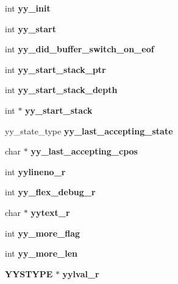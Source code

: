 \begin{DoxyCompactItemize}
\item 
int {\bfseries yy\-\_\-init}\label{structyyguts__t_abbef56b2d8359f6a15629c104f5dd030}

\item 
int {\bfseries yy\-\_\-start}\label{structyyguts__t_a8baf7d47fe53035d9bc2a9670795ff01}

\item 
int {\bfseries yy\-\_\-did\-\_\-buffer\-\_\-switch\-\_\-on\-\_\-eof}\label{structyyguts__t_a2daec411627700709ef2fd927e69627d}

\item 
int {\bfseries yy\-\_\-start\-\_\-stack\-\_\-ptr}\label{structyyguts__t_ad9e132dacc2904a8ae76c64c72e33795}

\item 
int {\bfseries yy\-\_\-start\-\_\-stack\-\_\-depth}\label{structyyguts__t_a35bedf1c17debd766565b99c39132eb4}

\item 
int $\ast$ {\bfseries yy\-\_\-start\-\_\-stack}\label{structyyguts__t_af6e2e45a5fdba0f313c680b35da4292a}

\item 
yy\-\_\-state\-\_\-type {\bfseries yy\-\_\-last\-\_\-accepting\-\_\-state}\label{structyyguts__t_a84e01a3658729e9d69f79feb3faf1c99}

\item 
char $\ast$ {\bfseries yy\-\_\-last\-\_\-accepting\-\_\-cpos}\label{structyyguts__t_a46fb8d232ed375921af0b37caeeb67c4}

\item 
int {\bfseries yylineno\-\_\-r}\label{structyyguts__t_aa9f13776b8d311e847cc7d974d49af4c}

\item 
int {\bfseries yy\-\_\-flex\-\_\-debug\-\_\-r}\label{structyyguts__t_a5ad72d75ed6d693824fe7e02ce21118e}

\item 
char $\ast$ {\bfseries yytext\-\_\-r}\label{structyyguts__t_aebaa731ad6cbe2411d104925e5bb3f2c}

\item 
int {\bfseries yy\-\_\-more\-\_\-flag}\label{structyyguts__t_a664a72171cc3e720fcb8120af9b72883}

\item 
int {\bfseries yy\-\_\-more\-\_\-len}\label{structyyguts__t_a683563bf4cd73f25b4c7b78579c1330e}

\item 
{\bf Y\-Y\-S\-T\-Y\-P\-E} $\ast$ {\bfseries yylval\-\_\-r}\label{structyyguts__t_a55dbdcd46a36d34adcbfc29be44d10cf}

\end{DoxyCompactItemize}


